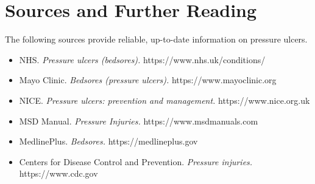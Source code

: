 \section*{Sources and Further Reading}
The following sources provide reliable, up-to-date information on pressure ulcers.
\begin{itemize}
    \item NHS. \textit{Pressure ulcers (bedsores).} https://www.nhs.uk/conditions/
    \item Mayo Clinic. \textit{Bedsores (pressure ulcers).} https://www.mayoclinic.org
    \item NICE. \textit{Pressure ulcers: prevention and management.} https://www.nice.org.uk
    \item MSD Manual. \textit{Pressure Injuries.} https://www.msdmanuals.com
    \item MedlinePlus. \textit{Bedsores.} https://medlineplus.gov
    \item Centers for Disease Control and Prevention. \textit{Pressure injuries.} https://www.cdc.gov
\end{itemize}
